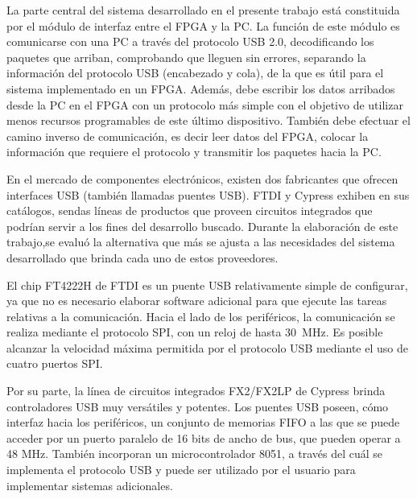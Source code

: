 La parte central del sistema desarrollado en el presente trabajo está constituida por el módulo de interfaz entre el FPGA y la PC. La función de este módulo es comunicarse con una PC a través del protocolo USB 2.0, decodificando los paquetes que arriban, comprobando que lleguen sin errores, separando la información del protocolo USB (encabezado y cola), de la que es útil para el sistema implementado en un FPGA. Además, debe escribir los datos arribados desde la PC en el FPGA con un protocolo más simple con el objetivo de utilizar menos recursos programables de este último dispositivo. También debe efectuar el camino inverso de comunicación, es decir leer datos del FPGA, colocar la información que requiere el protocolo y transmitir los paquetes hacia la PC.%

En el mercado de componentes electrónicos, existen dos fabricantes que ofrecen interfaces USB (también llamadas puentes USB). FTDI y Cypress exhiben en sus catálogos, sendas líneas de productos que proveen circuitos integrados que podrían servir a los fines del desarrollo buscado. Durante la elaboración de este trabajo,se evaluó la alternativa que más se ajusta a las necesidades del sistema desarrollado que brinda cada uno de estos proveedores.

El chip FT4222H de FTDI es un puente USB relativamente simple de configurar, ya que no es necesario elaborar software adicional para que ejecute las tareas relativas a la comunicación. Hacia el lado de los periféricos, la comunicación se realiza mediante el protocolo SPI, con un reloj de hasta \SI{30}{\mega\hertz}. Es posible alcanzar la velocidad máxima permitida por el protocolo USB mediante el uso de cuatro puertos SPI.%

Por su parte, la línea de circuitos integrados FX2/FX2LP de Cypress brinda controladores USB muy versátiles y potentes. Los puentes USB poseen, cómo interfaz hacia los periféricos, un conjunto de memorias FIFO a las que se puede acceder por un puerto paralelo de 16 bits de ancho de bus, que pueden operar a 48 MHz. También incorporan un microcontrolador 8051, a través del cuál se implementa el protocolo USB y puede ser utilizado por el usuario para implementar sistemas adicionales.

